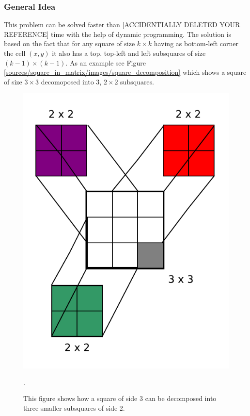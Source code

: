 \subsubsection{General Idea}
\label{sec:square_in_matrix:DP}
This problem can be solved faster than [ACCIDENTIALLY DELETED YOUR REFERENCE] time  with the help of dynamic programming. The solution is based on the fact that for any square
of size $k\times k$ having as bottom-left corner the cell $(x,y)$  it also has a top, top-left and left
subsquares of size $(k-1)\times (k-1)$. As an example see Figure
\ref{sources/square_in_matrix/images/square_decomposition} which shows a square of size $3\times 3$
decomoposed into $3$, $2\times 2$ subsquares.
\begin{figure}
	\centering
	\label{fig:square_in_matrix:squa_matrix_incremental2}
	\includegraphics[width=\textwidth/2]{sources/square_in_matrix/images/square_decomposition}
	\caption[Square of side $3$ decomposition into $3$ subsquares of side $2$.]
			{This figure shows how a square of side $3$ can be decomposed into three smaller
	subsquares of side $2$.}.
\end{figure}

